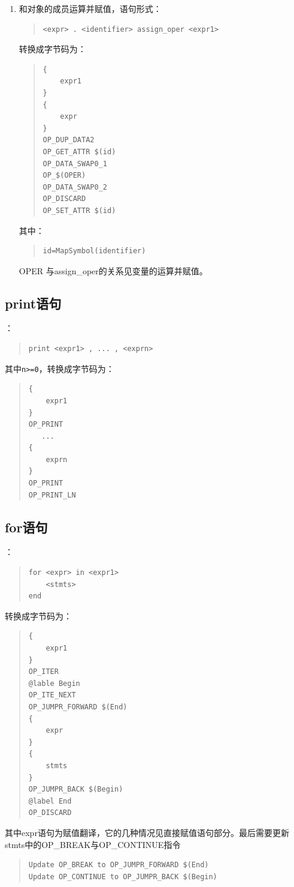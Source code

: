 \begin{enumerate}
\item 和对象的成员运算并赋值，语句形式：
\begin{quote}
\begin{verbatim}
<expr> . <identifier> assign_oper <expr1>
\end{verbatim}
\end{quote}
转换成字节码为：
\begin{quote}
\begin{verbatim}
{
    expr1
}
{
    expr 
}
OP_DUP_DATA2
OP_GET_ATTR $(id)
OP_DATA_SWAP0_1
OP_$(OPER)
OP_DATA_SWAP0_2
OP_DISCARD
OP_SET_ATTR $(id)
\end{verbatim}
\end{quote}
其中：
\begin{quote}
\begin{verbatim}
id=MapSymbol(identifier)
\end{verbatim}
\end{quote}
OPER 与assign\_oper的关系见变量的运算并赋值。
\end{enumerate}

\subsection{print语句}
：
\begin{quote}
\begin{verbatim}
print <expr1> , ... , <exprn>
\end{verbatim}
\end{quote}
其中\verb|n>=0|，转换成字节码为：
\begin{quote}
\begin{verbatim}
{
    expr1
}
OP_PRINT
   ...
{
    exprn
}
OP_PRINT
OP_PRINT_LN
\end{verbatim}
\end{quote}

\subsection{for语句}
：
\begin{quote}
\begin{verbatim}
for <expr> in <expr1>
    <stmts>
end
\end{verbatim}
\end{quote}
转换成字节码为：
\begin{quote}
\begin{verbatim}
{
    expr1
}
OP_ITER
@lable Begin
OP_ITE_NEXT
OP_JUMPR_FORWARD $(End)
{
    expr
}
{
    stmts
}
OP_JUMPR_BACK $(Begin)
@label End
OP_DISCARD 
\end{verbatim}
\end{quote}
其中expr语句为赋值翻译，它的几种情况见直接赋值语句部分。最后需要更新stmts中的OP\_BREAK与OP\_CONTINUE指令
\begin{quote}
\begin{verbatim}
Update OP_BREAK to OP_JUMPR_FORWARD $(End)
Update OP_CONTINUE to OP_JUMPR_BACK $(Begin)
\end{verbatim}
\end{quote}



